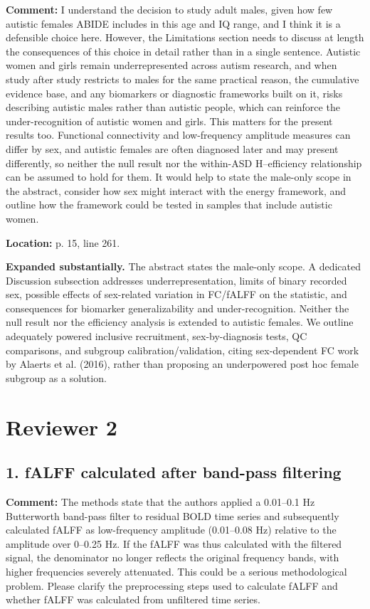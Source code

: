 \documentclass[11pt]{article}
\begin{document}
\textbf{Comment:} I understand the decision to study adult males, given how few autistic females ABIDE includes in this age and IQ range, and I think it is a defensible choice here. However, the Limitations section needs to discuss at length the consequences of this choice in detail rather than in a single sentence. Autistic women and girls remain underrepresented across autism research, and when study after study restricts to males for the same practical reason, the cumulative evidence base, and any biomarkers or diagnostic frameworks built on it, risks describing autistic males rather than autistic people, which can reinforce the under-recognition of autistic women and girls. This matters for the present results too. Functional connectivity and low-frequency amplitude measures can differ by sex, and autistic females are often diagnosed later and may present differently, so neither the null result nor the within-ASD H--efficiency relationship can be assumed to hold for them. It would help to state the male-only scope in the abstract, consider how sex might interact with the energy framework, and outline how the framework could be tested in samples that include autistic women.


\textbf{Location:} p. 15, line 261.


 \textbf{Expanded substantially.} The abstract states the male-only scope. A dedicated Discussion subsection addresses underrepresentation, limits of binary recorded sex, possible effects of sex-related variation in FC/fALFF on the statistic, and consequences for biomarker generalizability and under-recognition. Neither the null result nor the efficiency analysis is extended to autistic females. We outline adequately powered inclusive recruitment, sex-by-diagnosis tests, QC comparisons, and subgroup calibration/validation, citing sex-dependent FC work by Alaerts et al. (2016), rather than proposing an underpowered post hoc female subgroup as a solution.


\section*{Reviewer 2}

\subsection*{1. fALFF calculated after band-pass filtering}

\textbf{Comment:} The methods state that the authors applied a 0.01--0.1 Hz Butterworth band-pass filter to residual BOLD time series and subsequently calculated fALFF as low-frequency amplitude (0.01--0.08 Hz) relative to the amplitude over 0--0.25 Hz. If the fALFF was thus calculated with the filtered signal, the denominator no longer reflects the original frequency bands, with higher frequencies severely attenuated. This could be a serious methodological problem. Please clarify the preprocessing steps used to calculate fALFF and whether fALFF was calculated from unfiltered time series.
\end{document}
